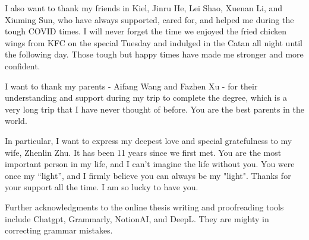 I also want to thank my friends in Kiel, Jinru He, Lei Shao, Xuenan Li, and Xiuming Sun, who have always supported, cared for, and helped me during the tough COVID times. I will never forget the time we enjoyed the fried chicken wings from KFC on the special Tuesday and indulged in the Catan all night until the following day. Those tough but happy times have made me stronger and more confident.

I want to thank my parents - Aifang Wang and Fazhen Xu - for their understanding and support during my trip to complete the degree, which is a very long trip that I have never thought of before. You are the best parents in the world.

In particular, I want to express my deepest love and special gratefulness to my wife, Zhenlin Zhu. It has been 11 years since we first met. You are the most important person in my life, and I can't imagine the life without you. You were once my “light”, and I firmly believe you can always be my "light". Thanks for your support all the time. I am so lucky to have you.

Further acknowledgments to the online thesis writing and proofreading tools include Chatgpt, Grammarly, NotionAI, and DeepL. They are mighty in correcting grammar mistakes.
 




